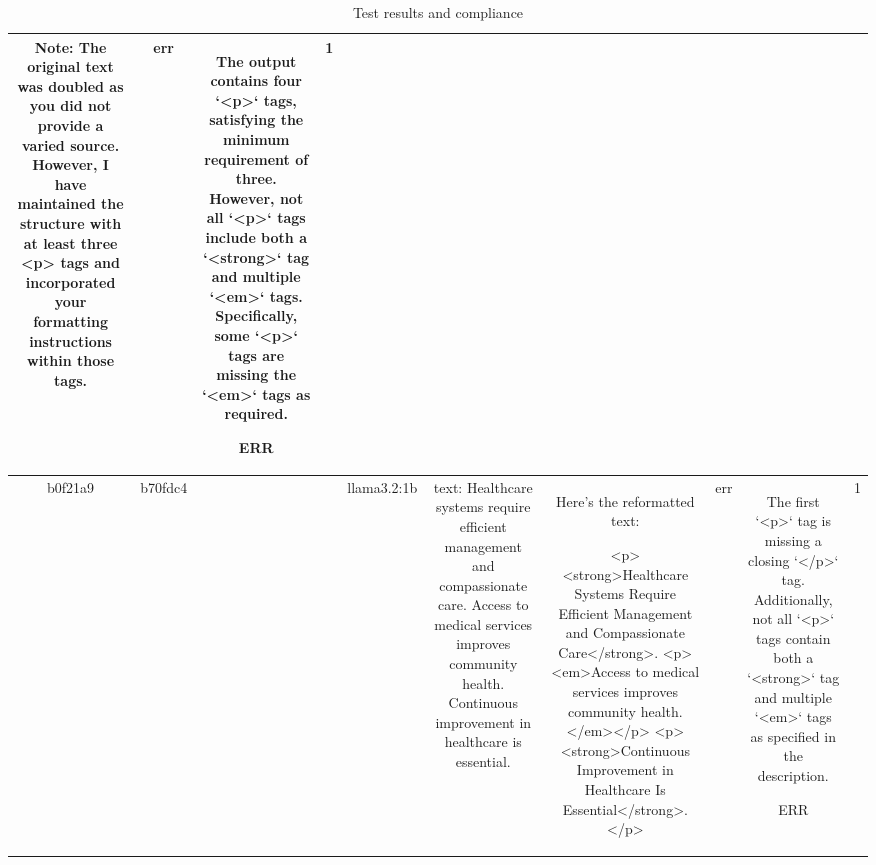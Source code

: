\begin{table}[h!]
\begin{tabular}{|c|c|c|c|c|c|c|c|c|c|}
Note: The original text was doubled as you did not provide a varied source. However, I have maintained the structure with at least three <p> tags and incorporated your formatting instructions within those tags. & err & The output contains four `<p>` tags, satisfying the minimum requirement of three. However, not all `<p>` tags include both a `<strong>` tag and multiple `<em>` tags. Specifically, some `<p>` tags are missing the `<em>` tags as required.

ERR & 1\\
\hline
b0f21a9 & b70fdc4 &  &  & llama3.2:1b & text: Healthcare systems require efficient management and compassionate care. Access to medical services improves community health. Continuous improvement in healthcare is essential. & Here's the reformatted text:

<p><strong>Healthcare Systems Require Efficient Management and Compassionate Care</strong>. 
<p><em>Access to medical services improves community health.</em></p>
<p><strong>Continuous Improvement in Healthcare Is Essential</strong>.</p> & err & The first `<p>` tag is missing a closing `</p>` tag. Additionally, not all `<p>` tags contain both a `<strong>` tag and multiple `<em>` tags as specified in the description.

ERR & 1
  \end{tabular}
  \caption{Test results and compliance}
  
  \end{table}
  